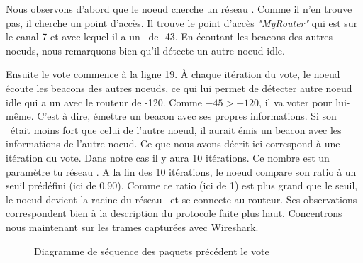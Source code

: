             Nous observons d'abord que le noeud cherche un réseau \espmesh. Comme il n'en trouve pas,
            il cherche un point d'accès. Il trouve le point d'accès \textit{"MyRouter"} qui est sur 
            le canal 7 et avec lequel il a un \rssi\ de -43. En écoutant les beacons
            des autres noeuds, nous remarquons bien qu'il détecte un autre noeud idle.


            Ensuite le vote commence à la ligne 19. À chaque itération du vote, le noeud
            écoute les beacons des autres noeuds, ce qui lui permet de détecter autre noeud idle qui a un \rssi
            avec le routeur de -120. Comme $-45 > -120$, il va voter pour lui-même. C'est à dire, émettre
            un beacon avec ses propres informations. Si son \rssi\ était moins fort que celui de l'autre noeud, 
            il aurait émis un beacon avec les informations de l'autre noeud. Ce que nous avons décrit ici
            correspond à une itération du vote. Dans notre cas il y aura 10 itérations. Ce nombre est un paramètre
            tu réseau \espmesh. A la fin des 10 itérations, le noeud compare son ratio à un seuil prédéfini (ici de 0.90).
            Comme ce ratio (ici de 1) est plus grand que le seuil, le noeud devient la racine du réseau \espmesh\ et 
            se connecte au routeur.
            Ses observations correspondent bien à la description du protocole faite plus haut.
            Concentrons nous maintenant sur les trames capturées avec Wireshark.

            \begin{figure}[H]
                \caption{Diagramme de séquence des paquets précédent le vote}
            \end{figure}


